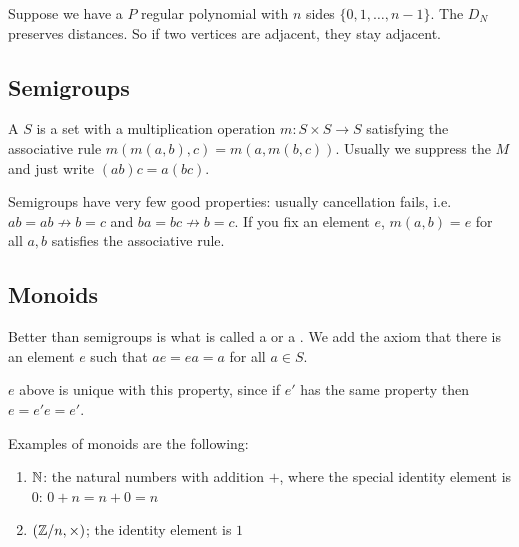 \documentclass[12pt]{scrartcl}
\begin{document}
\begin{example}
    Suppose we have a $P$ regular polynomial with $n$ sides $\{0, 1, \ldots, n-1\}$. The  $D_N$ preserves distances. So if two vertices are adjacent, they stay adjacent.
\end{example}


\subsection{Semigroups}
\begin{definition}
    A  $S$ is a set with a multiplication operation $m : S \times S \to S$ satisfying the associative rule $m(m(a, b), c) = m(a, m(b, c))$. Usually we suppress the $M$ and just write $(ab)c = a(bc)$.
\end{definition}

Semigroups have very few good properties: usually cancellation fails, i.e. $ab = ab \not\to b = c$ and $ba = bc \not \to b = c$. If you fix an element $e$, $m(a, b) = e$ for all $a, b$ satisfies the associative rule.

\subsection{Monoids}

\begin{definition}
    Better than semigroups is what is called a  or a . We add the axiom that there is an element $e$ such that $ae = ea = a$ for all $a \in S$.
\end{definition}

\begin{remark}
    $e$ above is unique with this property, since if $e'$ has the same property then $e=e'e = e'$.
\end{remark} 

\begin{example}
    Examples of monoids are the following:
        \begin{enumerate}
            \item $\mathbb N$: the natural numbers with addition $+$, where the special identity element is $0$: $0 + n = n + 0 = n$

            \item $(\mathbb Z / n, \times)$; the identity element is $1$
        \end{enumerate}
\end{example}
\end{document}
